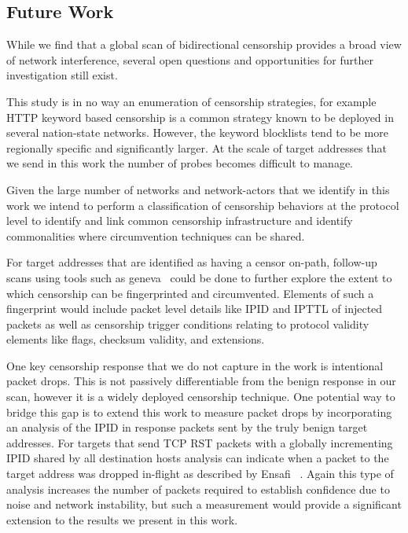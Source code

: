\subsection{Future Work} \label{sec:discussion:future}

While we find that a global scan of bidirectional censorship provides a broad
view of network interference, several open questions and opportunities for
further investigation still exist.

This study is in no way an enumeration of censorship strategies, for example
HTTP keyword based censorship is a common strategy known to be deployed in
several nation-state networks. However, the keyword blocklists tend to be more
regionally specific and significantly larger. At the scale of target addresses
that we send in this work the number of probes becomes difficult to manage.

Given the large number of networks and network-actors that we identify in this
work we intend to perform a classification of censorship behaviors at the
protocol level to identify and link common censorship infrastructure and
identify commonalities where circumvention techniques can be shared.

For target addresses that are identified as having a censor on-path, follow-up
scans using tools such as geneva~\cite{bock2019geneva} could be done to further
explore the extent to which censorship can be fingerprinted and circumvented.
Elements of such a fingerprint would include packet level details like IPID and
IPTTL of injected packets as well as censorship trigger conditions relating to
protocol validity elements like flags, checksum validity, and extensions.


One key censorship response that we do not capture in the work is intentional
packet drops. This is not passively differentiable from the benign response in
our scan, however it is a widely deployed censorship technique. One potential
way to bridge this gap is to extend this work to measure packet drops by
incorporating an analysis of the IPID in response packets sent by the truly
benign target addresses. For targets that send TCP RST packets with a globally
incrementing IPID shared by all destination hosts analysis can indicate when a
packet to the target address was dropped in-flight as described by Ensafi
\etal~\cite{ensafi:detecting}. Again this type of analysis increases the number
of packets required to establish confidence due to noise and network
instability, but such a measurement would provide a significant extension to the
results we present in this work.



